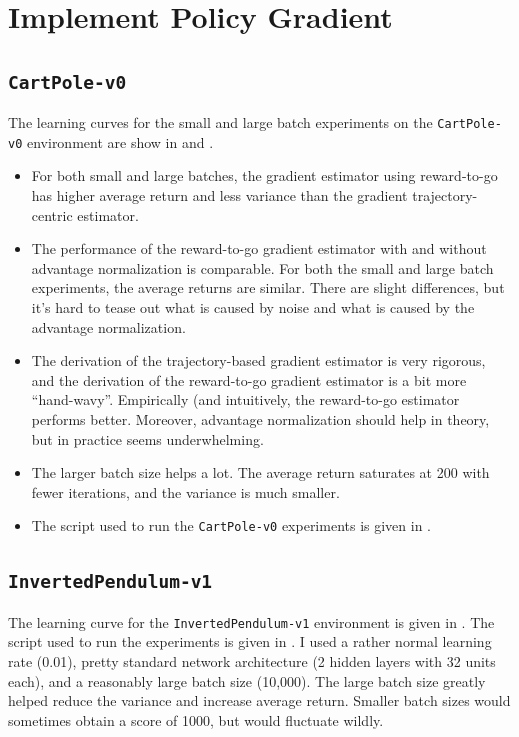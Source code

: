 \setcounter{section}{3}
\section{Implement Policy Gradient}
\subsection{\texttt{CartPole-v0}}
The learning curves for the small and large batch experiments on the
\texttt{CartPole-v0} environment are show in  and
.

\begin{itemize}
  \item
    For both small and large batches, the gradient estimator using reward-to-go
    has higher average return and less variance than the gradient
    trajectory-centric estimator.

  \item
    The performance of the reward-to-go gradient estimator with and without
    advantage normalization is comparable. For both the small and large batch
    experiments, the average returns are similar. There are slight differences,
    but it's hard to tease out what is caused by noise and what is caused by
    the advantage normalization.

  \item
    The derivation of the trajectory-based gradient estimator is very rigorous,
    and the derivation of the reward-to-go gradient estimator is a bit more
    ``hand-wavy''. Empirically (and intuitively, the reward-to-go estimator
    performs better. Moreover, advantage normalization should help in theory,
    but in practice seems underwhelming.

  \item
    The larger batch size helps a lot. The average return saturates at 200 with
    fewer iterations, and the variance is much smaller.

  \item
    The script used to run the \texttt{CartPole-v0} experiments is given in
    .
\end{itemize}

\subsection{\texttt{InvertedPendulum-v1}}
The learning curve for the \texttt{InvertedPendulum-v1} environment is given in
. The script used to run the experiments is given in
. I used a rather normal learning rate (0.01), pretty
standard network architecture (2 hidden layers with 32 units each), and a
reasonably large batch size (10,000). The large batch size greatly helped
reduce the variance and increase average return. Smaller batch sizes would
sometimes obtain a score of 1000, but would fluctuate wildly.

